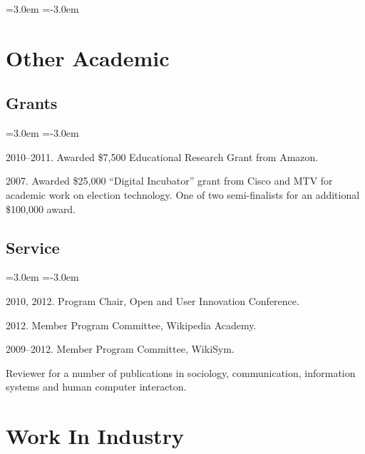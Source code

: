 \documentclass[10pt]{article}
\newenvironment{cvlist}{
\begin{list}{}{\leftmargin=3.0em \itemindent=-3.0em}
  \setlength{\itemsep}{0pt}
  \setlength{\parskip}{0em}
  \setlength{\parsep}{1em}
  \setlength{\parindent}{0em}}
{\vspace{1em}
\end{list}}
\begin{document}
\begin{cvlist}
\end{cvlist}

\section{Other Academic}


\subsection{Grants}

\begin{cvlist}
\item 2010--2011. Awarded \$7,500 Educational Research Grant from
  Amazon.

\item 2007. Awarded \$25,000 ``Digital Incubator'' grant from Cisco
  and MTV for academic work on election technology. One of two
  semi-finalists for an additional \$100,000 award.
\end{cvlist}


\subsection{Service}

\begin{cvlist}
\item 2010, 2012. Program Chair, Open and User Innovation Conference.
\item 2012. Member Program Committee, Wikipedia Academy.
\item 2009--2012. Member Program Committee, WikiSym.
\item Reviewer for a number of publications in sociology, communication,
  information systems and human computer interacton.
\end{cvlist}

\section{Work In Industry}
\end{document}
